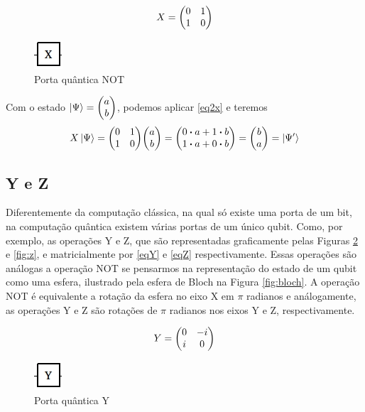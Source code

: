 \documentclass[a4paper, 12pt, oneside]{book}
\begin{document}
\begin{equation}\label{eq2x}
X =  \mqty(0&1\\1&0)
\end{equation}

\begin{figure}[H]
\centering
\includegraphics[scale=0.75]{x.jpg}
\caption{Porta quântica NOT}
\label{fig:not}
\end{figure}

Com o estado $\ket{\Psi} = \mqty(a\\b)$, podemos aplicar \eqref{eq2x} e teremos
\begin{align*}
X\ket{\Psi} = \mqty(0&1\\1&0)\mqty(a\\b) = \mqty(0 \vdot a+1 \vdot b \\1 \vdot a+0 \vdot b) = \mqty(b\\a) = \ket{\Psi'}
\end{align*}

\subsection{Y e Z} 
Diferentemente da computação clássica, na qual só existe uma porta de um bit, na computação quântica existem várias portas de um único qubit. Como, por exemplo, as operações Y e Z, que são representadas graficamente pelas Figuras \ref{fig:y} e \ref{fig:z}, e matricialmente por \eqref{eqY} e \eqref{eqZ} respectivamente. Essas operações são análogas a operação NOT se pensarmos na representação do estado de um qubit como uma esfera, ilustrado pela esfera de Bloch na Figura \ref{fig:bloch}. A operação NOT é equivalente a rotação da esfera no eixo X em $\pi$ radianos e análogamente, as operações Y e Z são rotações de $\pi$ radianos nos eixos Y e Z, respectivamente.

\begin{equation}\label{eqY}
Y =  \mqty(0&-i\\i&0)
\end{equation}

\begin{figure}[H]
\centering
\includegraphics[scale=0.75]{y.jpg}
\caption{Porta quântica Y}
\label{fig:y}
\end{figure}
\end{document}
